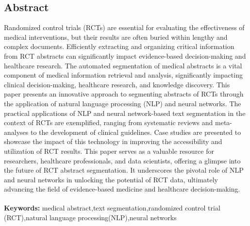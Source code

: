\documentclass[12pt,a4paper]{report}     %
\begin{document}
\newpage
		\newpage					%
		\pagestyle{plain}           %
		\begin{center}				%
			\begin{LARGE}
						\section*{ Abstract}
			\end{LARGE}
		\end{center}
		\begin{normalsize}
{\setlength{\baselineskip}{1.1\baselineskip}   %
\noindent %
Randomized control trials (RCTs) are essential for evaluating the effectiveness of medical interventions, but their results are often buried within lengthy and complex documents. Efficiently extracting and organizing critical information from RCT abstracts can significantly impact evidence-based decision-making and healthcare research. The automated segmentation of medical abstracts is a vital component of medical information retrieval and analysis, significantly impacting clinical decision-making, healthcare research, and knowledge discovery. This paper presents an innovative approach to segmenting abstracts of RCTs through the application of natural language processing (NLP) and neural networks. The practical applications of NLP and neural network-based text segmentation in the context of RCTs are exemplified, ranging from systematic reviews and meta-analyses to the development of clinical guidelines. Case studies are presented to showcase the impact of this technology in improving the accessibility and utilization of RCT results. This paper serves as a valuable resource for researchers, healthcare professionals, and data scientists, offering a glimpse into the future of RCT abstract segmentation. It underscores the pivotal role of NLP and neural networks in unlocking the potential of RCT data, ultimately advancing the field of evidence-based medicine and healthcare decision-making.  \\\\ 
\textbf{Keywords:} %
medical abstract,text segmentation,randomized control trial (RCT),natural language processing(NLP),neural networks\\\\
\par}
		\end{normalsize}
\newpage
\end{document}
